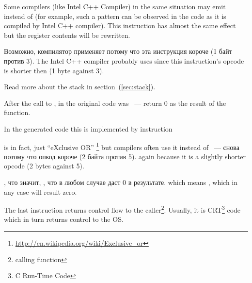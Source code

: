 {Some compilers (like Intel C++ Compiler) in the same situation may emit  
instead of \ADD (for example, such a pattern can be observed in the \oracle{} code as it is compiled by Intel C++ compiler).
This instruction has almost the same effect but the \ECX register contents will be rewritten.}

\IFRU
{Возможно, компилятор применяет  потому что эта инструкция короче (1 байт против 3).}
{The Intel C++ compiler probably uses  since this instruction's opcode is shorter then 
 (1 byte against 3).}

{Read more about the stack in section}~(\ref{sec:stack}).

{After the call to \printf, in the original \CCpp code was  ~--- 
return $0$ as the result of the \main function.}

{In the generated code this is implemented by instruction}  

{\XOR is in fact, just ``eXclusive OR''}
\footnote{\url{http://en.wikipedia.org/wiki/Exclusive_or}}
{but compilers often use it instead of}
 ~--- 
\IFRU
{снова потому что опкод короче (2 байта против 5).}
{again because it is a slightly shorter opcode (2 bytes against 5).}

, 
\IFRU
{что значит, , что в любом случае даст 0 в результате.}
{which means , which in any case will result zero.}

{The last instruction \RET returns control flow to the caller\footnote{calling function}.
Usually, it is \CCpp CRT\footnote{C Run-Time Code} code which in turn
returns control to the \ac{OS}.}

